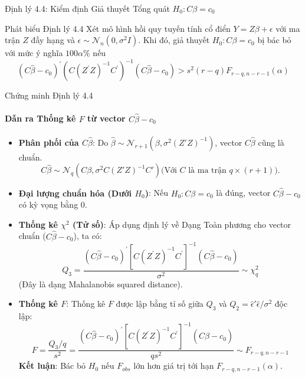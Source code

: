 \begin{frame}{Định lý 4.4: Kiểm định Giả thuyết Tổng quát $H_0: C\beta = c_0$}

    \begin{block}{Phát biểu Định lý 4.4}
        Xét mô hình hồi quy tuyến tính cổ điển $Y=Z\beta+\epsilon$ với ma trận $Z$ đầy hạng và $\mathcal{\epsilon}\sim\mathcal{N}_{n}(0,\sigma^{2}I)$.
        Khi đó, giả thuyết $H_{0}:C\beta=c_{0}$ bị bác bỏ với mức ý nghĩa $100\alpha\%$ nếu
        \[
            (C\hat{\beta}-c_{0})^{\prime}(C(Z^{\prime}Z)^{-1}C^{\prime})^{-1}(C\hat{\beta}-c_{0})>s^{2}(r-q)F_{r-q,n-r-1}(\alpha)
        \]
    \end{block}
\end{frame}
\begin{frame}{Chứng minh Định lý 4.4 }
    \framesubtitle{Dẫn ra Thống kê $F$ từ vector $C\hat{\beta} - c_0$}

    \begin{itemize}
        \item \textbf{Phân phối của $C\hat{\beta}$}: Do $\hat{\beta} \sim \mathcal{N}_{r+1}(\beta, \sigma^2 (Z'Z)^{-1})$, vector $C\hat{\beta}$ cũng là chuẩn.
        \[
            C\hat{\beta} \sim \mathcal{N}_q(C\beta, \sigma^2 C(Z'Z)^{-1}C') \text{(Với $C$ là ma trận $q \times (r+1)$).}
        \]
        \item \textbf{Đại lượng chuẩn hóa (Dưới $H_0$)}: Nếu $H_0: C\beta = c_0$ là đúng, vector $C\hat{\beta} - c_0$ có kỳ vọng bằng 0.

        \item \textbf{Thống kê $\chi^2$ (Tử số)}: Áp dụng định lý về Dạng Toàn phương cho vector chuẩn ($C\hat{\beta} - c_0$), ta có:
        \[
            Q_3 = \frac{(C\hat{\beta}-c_{0})^{\prime}[C(Z^{\prime}Z)^{-1}C^{\prime}]^{-1}(C\hat{\beta}-c_{0})}{\sigma^2} \sim \chi^2_q
        \]
        (Đây là dạng Mahalanobis squared distance).
        \item \textbf{Thống kê $F$}: Thống kê $F$ được lập bằng tỉ số giữa $Q_3$ và $Q_2 = \hat{\epsilon}'\hat{\epsilon}/\sigma^2$ độc lập:
        \[
            F = \frac{Q_3/q}{s^2} = \frac{(C\hat{\beta}-c_{0})^{\prime}[C(Z^{\prime}Z)^{-1}C^{\prime}]^{-1}(C\hat{\beta}-c_{0})}{q s^2} \sim F_{r-q, n-r-1}
        \]
        \textbf{Kết luận}: Bác bỏ $H_0$ nếu $F_{obs}$ lớn hơn giá trị tới hạn $F_{r-q, n-r-1}(\alpha)$.
    \end{itemize}
\end{frame}


